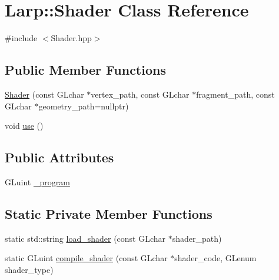 \hypertarget{classLarp_1_1Shader}{\section{Larp\-:\-:Shader Class Reference}
\label{classLarp_1_1Shader}
}


{\ttfamily \#include $<$Shader.\-hpp$>$}

\subsection*{Public Member Functions}
\begin{DoxyCompactItemize}
\item 
\hyperlink{classLarp_1_1Shader_a02cd13e09037075d62c3566e2fc797ab}{Shader} (const G\-Lchar $\ast$vertex\-\_\-path, const G\-Lchar $\ast$fragment\-\_\-path, const G\-Lchar $\ast$geometry\-\_\-path=nullptr)
\item 
void \hyperlink{classLarp_1_1Shader_a781750e2455007153ea226c0928bc24a}{use} ()
\end{DoxyCompactItemize}
\subsection*{Public Attributes}
\begin{DoxyCompactItemize}
\item 
G\-Luint \hyperlink{classLarp_1_1Shader_ae900fbc780cccf1e37eebee294caa69f}{\-\_\-program}
\end{DoxyCompactItemize}
\subsection*{Static Private Member Functions}
\begin{DoxyCompactItemize}
\item 
static std\-::string \hyperlink{classLarp_1_1Shader_abf92153766512f9180d0d85062625446}{load\-\_\-shader} (const G\-Lchar $\ast$shader\-\_\-path)
\item 
static G\-Luint \hyperlink{classLarp_1_1Shader_ab2b03a9fe1ae3073e87268c7374af3f7}{compile\-\_\-shader} (const G\-Lchar $\ast$shader\-\_\-code, G\-Lenum shader\-\_\-type)
\end{DoxyCompactItemize}


